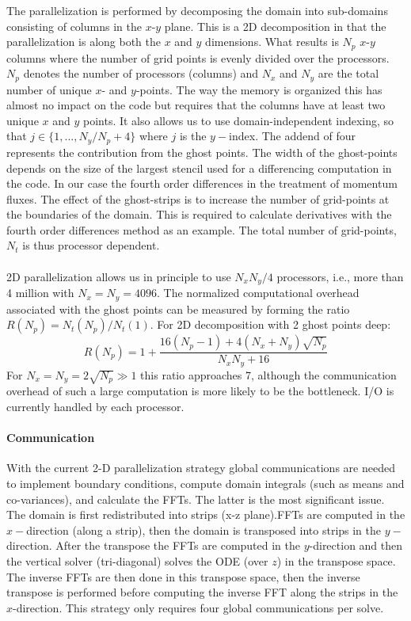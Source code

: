\documentclass[11pt,a4paper]{article}
\begin{document}
The parallelization is performed by decomposing the domain into
sub-domains consisting of columns in the $x$-$y$ plane. This is
a 2D decomposition in that the parallelization is along both the
$x$ and $y$ dimensions. What results is $N_p$ $x$-$y$ columns
where the number of grid points is evenly divided over the processors.
$N_p$ denotes the number of processors (columns) and $N_x$ and $N_y$
are the total number of unique $x$- and $y$-points. The way the
memory is organized this has almost no impact on the code but
requires that the columns have at least two unique $x$ and $y$
points. It also allows us to use domain-independent indexing,
so that $j \in \{1,\ldots,N_y/N_p+4\}$ where $j$ is the $y-$index.
The addend of four represents the contribution from the ghost points.
The width of the ghost-points depends on the size of the largest
stencil used for a differencing computation in the code.
In our case the fourth order differences in the treatment of momentum
fluxes. The effect of the ghost-strips is to increase the number of
grid-points at the boundaries of the domain. This is required to
calculate derivatives with the fourth order differences method as an
example. The total number of grid-points, $N_t$ is thus processor dependent.
\\
\\
2D parallelization allows us in principle to use $N_xN_y/4$
processors, i.e., more than 4 million with $N_x=N_y=4096$.
The normalized computational overhead associated with the ghost points
can be measured by forming the ratio $R(N_p) = N_t(N_p)/N_t(1)$.
For 2D decomposition with 2 ghost points deep:
\[R(N_p) = 1 + \frac{16(N_p-1) + 4(N_x+N_y)\sqrt{N_p}}{N_xN_y + 16} \]
For $N_x = N_y = 2\sqrt{N_p} \gg 1$ this ratio approaches 7, although
the communication overhead of such a large computation is more likely
to be the bottleneck. I/O is currently handled by each processor.

\paragraph{Communication}
With the current 2-D parallelization strategy global communications
are needed to implement boundary conditions, compute domain
integrals (such as means and co-variances), and calculate the FFTs.
The latter is the most significant issue. The domain is first redistributed
into strips (x-z plane).FFTs are computed in the $x-$direction (along a strip),
then the domain is transposed into strips in the $y-$direction.
After the transpose the FFTs are computed in the $y$-direction and
then the vertical solver (tri-diagonal) solves the ODE (over $z$) in
the transpose space.  The inverse FFTs are then done in this transpose
space, then the inverse transpose is performed before computing the
inverse FFT along the strips in the $x$-direction.  This strategy only
requires four global communications per solve.
\end{document}
